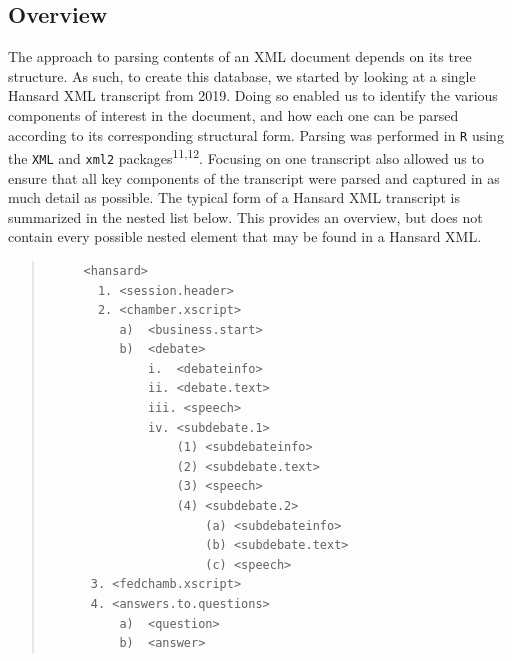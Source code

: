 \documentclass[
  letterpaper,
  DIV=11,
  numbers=noendperiod]{scrartcl}
\begin{document}
\hypertarget{sec-overview}{%
\subsection{Overview}\label{sec-overview}}

The approach to parsing contents of an XML document depends on its tree
structure. As such, to create this database, we started by looking at a
single Hansard XML transcript from 2019. Doing so enabled us to identify
the various components of interest in the document, and how each one can
be parsed according to its corresponding structural form. Parsing was
performed in \texttt{R} using the \texttt{XML} and \texttt{xml2}
packages\textsuperscript{11,12}. Focusing on one transcript also allowed
us to ensure that all key components of the transcript were parsed and
captured in as much detail as possible. The typical form of a Hansard
XML transcript is summarized in the nested list below. This provides an
overview, but does not contain every possible nested element that may be
found in a Hansard XML.

\begin{quote}
\begin{verbatim}
     <hansard>
       1. <session.header>
       2. <chamber.xscript>
          a)  <business.start>
          b)  <debate>
              i.  <debateinfo>
              ii. <debate.text>
              iii. <speech>
              iv. <subdebate.1>
                  (1) <subdebateinfo>
                  (2) <subdebate.text>
                  (3) <speech>
                  (4) <subdebate.2>
                      (a) <subdebateinfo>
                      (b) <subdebate.text>
                      (c) <speech>
      3. <fedchamb.xscript>
      4. <answers.to.questions>
          a)  <question>
          b)  <answer>
\end{verbatim}
\end{quote}
\end{document}
